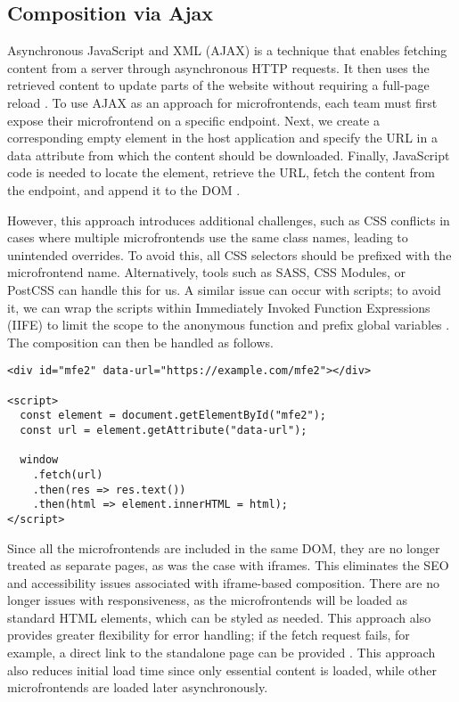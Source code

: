 \subsection{Composition via Ajax}
Asynchronous JavaScript and XML (AJAX) is a technique that enables fetching content from a server through asynchronous HTTP requests. It then uses the retrieved content to update parts of the website without requiring a full-page reload \cite{Ajax}. To use AJAX as an approach for microfrontends, each team must first expose their microfrontend on a specific endpoint. Next, we create a corresponding empty element in the host application and specify the URL in a data attribute from which the content should be downloaded. Finally, JavaScript code is needed to locate the element, retrieve the URL, fetch the content from the endpoint, and append it to the DOM \cite{Geers}.\

\noindent
However, this approach introduces additional challenges, such as CSS conflicts in cases where multiple microfrontends use the same class names, leading to unintended overrides. To avoid this, all CSS selectors should be prefixed with the microfrontend name. Alternatively, tools such as SASS, CSS Modules, or PostCSS \cite{PostCSS} can handle this for us. A similar issue can occur with scripts; to avoid it, we can wrap the scripts within Immediately Invoked Function Expressions (IIFE) to limit the scope to the anonymous function and prefix global variables \cite{Geers}. The composition can then be handled as follows.
\begin{verbatim}
<div id="mfe2" data-url="https://example.com/mfe2"></div>
               
<script>
  const element = document.getElementById("mfe2");
  const url = element.getAttribute("data-url");

  window
    .fetch(url)
    .then(res => res.text())
    .then(html => element.innerHTML = html);
</script>
\end{verbatim}
Since all the microfrontends are included in the same DOM, they are no longer treated as separate pages, as was the case with iframes. This eliminates the SEO and accessibility issues associated with iframe-based composition. There are no longer issues with responsiveness, as the microfrontends will be loaded as standard HTML elements, which can be styled as needed. This approach also provides greater flexibility for error handling; if the fetch request fails, for example, a direct link to the standalone page can be provided \cite{Geers}. This approach also reduces initial load time since only essential content is loaded, while other microfrontends are loaded later asynchronously.

